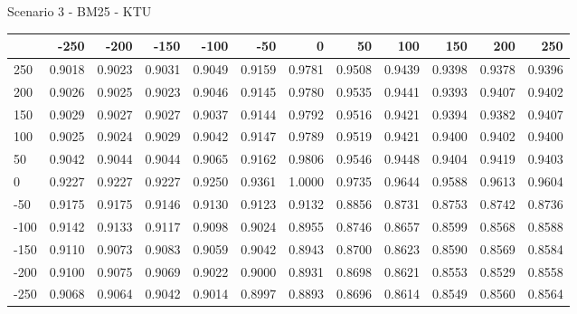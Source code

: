 Scenario 3 - BM25 - KTU
\begin{tabular}{lrrrrrrrrrrr}
\toprule
{} &   -250 &   -200 &   -150 &   -100 &   -50  &    0   &    50  &    100 &    150 &    200 &    250 \\
\midrule
 250 & 0.9018 & 0.9023 & 0.9031 & 0.9049 & 0.9159 & 0.9781 & 0.9508 & 0.9439 & 0.9398 & 0.9378 & 0.9396 \\
 200 & 0.9026 & 0.9025 & 0.9023 & 0.9046 & 0.9145 & 0.9780 & 0.9535 & 0.9441 & 0.9393 & 0.9407 & 0.9402 \\
 150 & 0.9029 & 0.9027 & 0.9027 & 0.9037 & 0.9144 & 0.9792 & 0.9516 & 0.9421 & 0.9394 & 0.9382 & 0.9407 \\
 100 & 0.9025 & 0.9024 & 0.9029 & 0.9042 & 0.9147 & 0.9789 & 0.9519 & 0.9421 & 0.9400 & 0.9402 & 0.9400 \\
 50  & 0.9042 & 0.9044 & 0.9044 & 0.9065 & 0.9162 & 0.9806 & 0.9546 & 0.9448 & 0.9404 & 0.9419 & 0.9403 \\
 0   & 0.9227 & 0.9227 & 0.9227 & 0.9250 & 0.9361 & 1.0000 & 0.9735 & 0.9644 & 0.9588 & 0.9613 & 0.9604 \\
-50  & 0.9175 & 0.9175 & 0.9146 & 0.9130 & 0.9123 & 0.9132 & 0.8856 & 0.8731 & 0.8753 & 0.8742 & 0.8736 \\
-100 & 0.9142 & 0.9133 & 0.9117 & 0.9098 & 0.9024 & 0.8955 & 0.8746 & 0.8657 & 0.8599 & 0.8568 & 0.8588 \\
-150 & 0.9110 & 0.9073 & 0.9083 & 0.9059 & 0.9042 & 0.8943 & 0.8700 & 0.8623 & 0.8590 & 0.8569 & 0.8584 \\
-200 & 0.9100 & 0.9075 & 0.9069 & 0.9022 & 0.9000 & 0.8931 & 0.8698 & 0.8621 & 0.8553 & 0.8529 & 0.8558 \\
-250 & 0.9068 & 0.9064 & 0.9042 & 0.9014 & 0.8997 & 0.8893 & 0.8696 & 0.8614 & 0.8549 & 0.8560 & 0.8564 \\
\bottomrule
\end{tabular}

